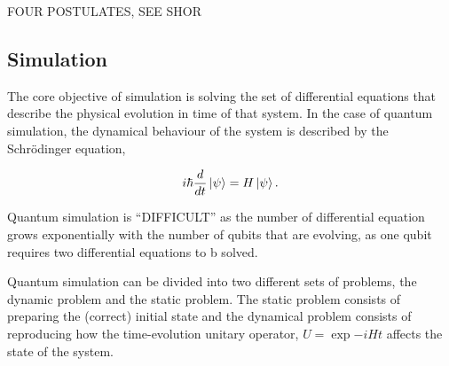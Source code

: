 FOUR POSTULATES, SEE SHOR


\subsection{Simulation}

The core objective of simulation is solving the set of differential equations that describe the physical evolution in time of that system. In the case of quantum simulation, the dynamical behaviour of the system is described by the Schrödinger equation,

$$ i \hbar \frac{d}{dt} \ket{\psi} = H \ket{\psi}.$$

Quantum simulation is ``DIFFICULT'' as the number of differential equation grows exponentially with the number of qubits that are evolving, as one qubit requires two differential equations to b solved.


Quantum simulation can be divided into two different sets of problems, the dynamic problem and the static problem. The static problem consists of preparing the (correct) initial state and the dynamical problem consists of reproducing how the time-evolution unitary operator, $U= \exp{-iHt}$ affects the state of the system.
